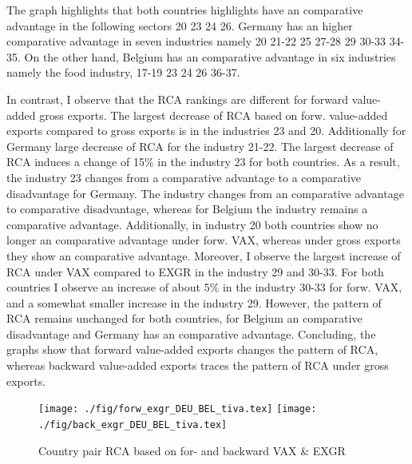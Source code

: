 The graph highlights that both countries highlights have an comparative advantage in the following sectors 20 23 24 26.
Germany has an higher comparative advantage in seven industries namely 20 21-22 25 27-28 29 30-33 34-35.
On the other hand, Belgium has an comparative advantage in six industries namely the food industry, 17-19 23 24 26 36-37.
 \par
In contrast, I observe that the RCA rankings are different for forward value-added gross exports.
The largest decrease of RCA based on forw. value-added exports compared to gross exports is in the industries 23 and 20.
Additionally for Germany large decrease of RCA for the industry 21-22.
The largest decrease of RCA induces a change of 15\%  in the industry 23 for both countries.
As a result, the industry 23 changes from a comparative advantage to a comparative disadvantage for Germany.
The industry changes from an comparative advantage to comparative disadvantage, whereas for Belgium the industry remains a comparative advantage.
Additionally, in industry 20 both countries show no longer an comparative advantage under forw. VAX, whereas under gross exports they show an comparative advantage.
Moreover, I observe the largest increase of RCA under VAX compared to EXGR in the industry 29 and 30-33.
For both countries I observe an increase of about 5\% in the industry 30-33 for forw. VAX, and a somewhat smaller increase in the industry 29.
However, the pattern of RCA remains unchanged for both countries, for Belgium an comparative disadvantage and Germany has an comparative advantage.
Concluding, the graphs show that forward value-added exports changes the pattern of RCA, whereas backward value-added exports traces the pattern of RCA under gross exports.
 \begin{figure}
\caption{Country pair RCA based on for- and backward  VAX \& EXGR }
\texttt{[image: ./fig/forw\_exgr\_DEU\_BEL\_tiva.tex]}
\texttt{[image: ./fig/back\_exgr\_DEU\_BEL\_tiva.tex]}
\end{figure}

